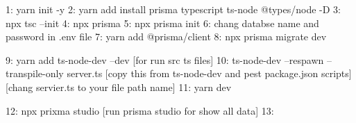 1: yarn init -y
2: yarn add install prisma typescript ts-node @types/node -D
3: npx tsc --init
4: npx prisma
5: npx prisma init
6: chang databse name and password in .env file 
7: yarn add @prisma/client
8: npx prisma migrate dev


9: yarn add ts-node-dev --dev [for run src ts files]
10: ts-node-dev --respawn --transpile-only server.ts [copy this from ts-node-dev and pest package.json scripts] [chang servier.ts to your file path name]
11: yarn dev


12: npx prixma studio [run prisma studio for show all data]
13:



